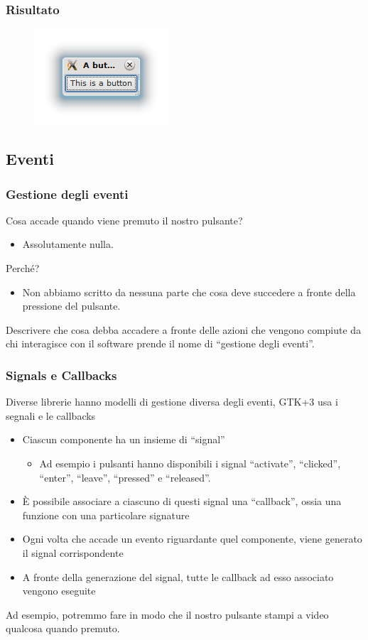 \documentclass{beamer}
\begin{document}
\begin{frame}
\frametitle{Risultato}
\begin{figure}
 \includegraphics[width=0.6\columnwidth]{img/2}
\end{figure}
\end{frame}


\subsection{Eventi}

\begin{frame}
\frametitle{Gestione degli eventi}
Cosa accade quando viene premuto il nostro pulsante?
\begin{itemize}
 \item Assolutamente nulla.
\end{itemize}
Perché?
\begin{itemize}
 \item Non abbiamo scritto da nessuna parte che cosa deve succedere a fronte della pressione del pulsante.
\end{itemize}
Descrivere che cosa debba accadere a fronte delle azioni che vengono compiute da chi interagisce con il software prende il nome di ``gestione degli eventi''.
\end{frame}

\begin{frame}
\frametitle{Signals e Callbacks}
Diverse librerie hanno modelli di gestione diversa degli eventi, GTK+3 usa i segnali e le callbacks
 \begin{itemize}
  \item Ciascun componente ha un insieme di ``signal''
  \begin{itemize}
   \item Ad esempio i pulsanti hanno disponibili i signal ``activate'', ``clicked'', ``enter'', ``leave'', ``pressed'' e ``released''.
  \end{itemize}
  \item È possibile associare a ciascuno di questi signal una ``callback'', ossia una funzione con una particolare signature
  \item Ogni volta che accade un evento riguardante quel componente, viene generato il signal corrispondente
  \item A fronte della generazione del signal, tutte le callback ad esso associato vengono eseguite
 \end{itemize}
Ad esempio, potremmo fare in modo che il nostro pulsante stampi a video qualcosa quando premuto.
\end{frame}
\end{document}
